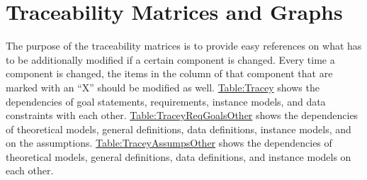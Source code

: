 \documentclass[12pt]{article}
\begin{document}
\section{Traceability Matrices and Graphs}
\label{Sec:TraceMatrices}
The purpose of the traceability matrices is to provide easy references on what has to be additionally modified if a certain component is changed. Every time a component is changed, the items in the column of that component that are marked with an ``X'' should be modified as well. \hyperref[Table:Tracey]{Table:Tracey} shows the dependencies of goal statements, requirements, instance models, and data constraints with each other. \hyperref[Table:TraceyReqGoalsOther]{Table:TraceyReqGoalsOther} shows the dependencies of theoretical models, general definitions, data definitions, instance models, and on the assumptions. \hyperref[Table:TraceyAssumpsOther]{Table:TraceyAssumpsOther} shows the dependencies of theoretical models, general definitions, data definitions, and instance models on each other.
\end{document}
